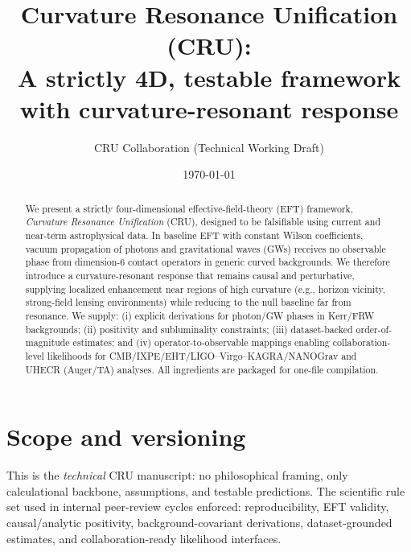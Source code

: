 \documentclass[%
 reprint,
 amsmath,amssymb,
 aps,
 pra,
 longbibliography,
 nofootinbib
]{revtex4-2}
\begin{document}
\title{Curvature Resonance Unification (CRU):\\
A strictly 4D, testable framework with curvature-resonant response}

\author{CRU Collaboration (Technical Working Draft)}

\date{\today}

\begin{abstract}
We present a strictly four-dimensional effective-field-theory (EFT) framework, \emph{Curvature Resonance Unification} (CRU), designed to be falsifiable using current and near-term astrophysical data. In baseline EFT with constant Wilson coefficients, vacuum propagation of photons and gravitational waves (GWs) receives no observable phase from dimension-6 contact operators in generic curved backgrounds. We therefore introduce a curvature-resonant response that remains causal and perturbative, supplying localized enhancement near regions of high curvature (e.g., horizon vicinity, strong-field lensing environments) while reducing to the null baseline far from resonance. We supply: (i) explicit derivations for photon/GW phases in Kerr/FRW backgrounds; (ii) positivity and subluminality constraints; (iii) dataset-backed order-of-magnitude estimates; and (iv) operator-to-observable mappings enabling collaboration-level likelihoods for CMB/IXPE/EHT/LIGO–Virgo–KAGRA/NANOGrav and UHECR (Auger/TA) analyses. All ingredients are packaged for one-file compilation. 
\end{abstract}

\maketitle

\section{Scope and versioning}
\label{sec:scope}
This is the \emph{technical} CRU manuscript: no philosophical framing, only calculational backbone, assumptions, and testable predictions. The scientific rule set used in internal peer-review cycles enforced: reproducibility, EFT validity, causal/analytic positivity, background-covariant derivations, dataset-grounded estimates, and collaboration-ready likelihood interfaces.

\end{document}
